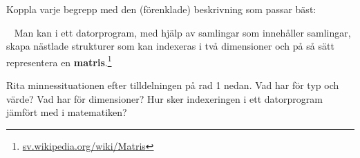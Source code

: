 

\ifPreSolution

\Exercise{\ExeWeekEIGHT}\label{exe:W08}

\begin{Goals}

\end{Goals}

\begin{Preparations}
\item {}
\end{Preparations}

\BasicTasks

\else

\ExerciseSolution{\ExeWeekEIGHT}

\BasicTasks

\fi




\QUESTBEGIN

\Task \what

\vspace{1em}\noindent Koppla varje begrepp med den (förenklade) beskrivning som passar bäst:

\begin{ConceptConnections}

\end{ConceptConnections}

\SOLUTION

\TaskSolved \what

\begin{ConceptConnections}

\end{ConceptConnections}

\QUESTEND





\QUESTBEGIN

\Task  \what~  Man kan i ett datorprogram, med hjälp av samlingar som innehåller samlingar, skapa nästlade strukturer som kan indexeras i två dimensioner och på så sätt representera en  \textbf{matris}.\footnote{\href{https://sv.wikipedia.org/wiki/Matris}{sv.wikipedia.org/wiki/Matris}}

\Subtask Rita minnessituationen efter tilldelningen på rad 1 nedan. Vad har  för typ och värde? Vad har  för dimensioner? Hur sker indexeringen i ett datorprogram jämfört med i matematiken?

